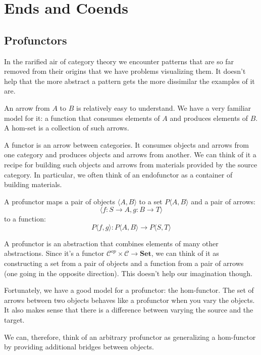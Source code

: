 \documentclass[DaoFP]{subfiles}
\begin{document}
\setcounter{chapter}{16}

\chapter{Ends and Coends}

\section{Profunctors}

In the rarified air of category theory we encounter patterns that are so far removed from their origins that we have problems visualizing them. It doesn't help that the more abstract a pattern gets the more dissimilar the examples of it are. 

An arrow from $A$ to $B$ is relatively easy to understand. We have a very familiar model for it: a function that consumes elements of $A$ and produces elements of $B$. A hom-set is a collection of such arrows. 

A functor is an arrow between categories. It consumes objects and arrows from one category and produces objects and arrows from another. We can think of it a recipe for building such objects and arrows from materials provided by the source category. In particular, we  often think of an endofunctor as a container of building materials.

A profunctor maps a pair of objects $\langle A, B \rangle$ to a set $P\langle A, B \rangle$ and a pair of arrows:
\[ \langle f \colon S \to A, g \colon B \to T \rangle \]
to a function:
\[ P\langle f, g \rangle \colon P\langle A, B \rangle \to P\langle S, T \rangle\]

A profunctor is an abstraction that combines elements of many other abstractions. Since it's a functor $ \mathcal{C}^{op} \times  \mathcal{C} \to \mathbf{Set}$, we can think of it as constructing a set from a pair of objects and a function from a pair of arrows (one going in the opposite direction). This doesn't help our imagination though.

Fortunately, we have a good model for a profunctor: the hom-functor. The set of arrows between two objects behaves like a profunctor when you vary the objects. It also makes sense that there is a difference between varying the source and the target. 

We can, therefore, think of an arbitrary profunctor as generalizing a hom-functor by providing additional bridges between objects. 
\end{document}
